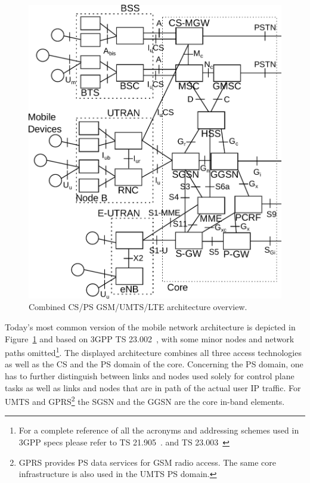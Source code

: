\begin{figure}[htbp]
	\centering
 	\includegraphics[width=1.0\textwidth]{images/3gpp-physical-arch.pdf}
 	\caption{Combined CS/PS GSM/UMTS/LTE architecture overview.}
 	\label{c4:fig:psdomain}
\end{figure}

Today's most common version of the mobile network architecture is depicted in Figure~\ref{c4:fig:psdomain} and based on 3GPP TS 23.002~\cite{3gpp.23.002}, with some minor nodes and network paths omitted\footnote{For a complete reference of all the acronyms and addressing schemes used in 3GPP specs please refer to TS 21.905~\cite{3gpp.21.905}. and TS 23.003~\cite{3gpp.23.003}}. The displayed architecture combines all three access technologies as well as the \gls{CS} and the \gls{PS} domain of the core. Concerning the \gls{PS} domain, one has to further distinguish between links and nodes used solely for control plane tasks as well as links and nodes that are in path of the actual user IP traffic. For \gls{UMTS} and \gls{GPRS}\footnote{\gls{GPRS} provides \gls{PS} data services for \gls{GSM} radio access. The same core infrastructure is also used in the \gls{UMTS} \gls{PS} domain.} the \gls{SGSN} and the \gls{GGSN} are the core in-band elements. 

